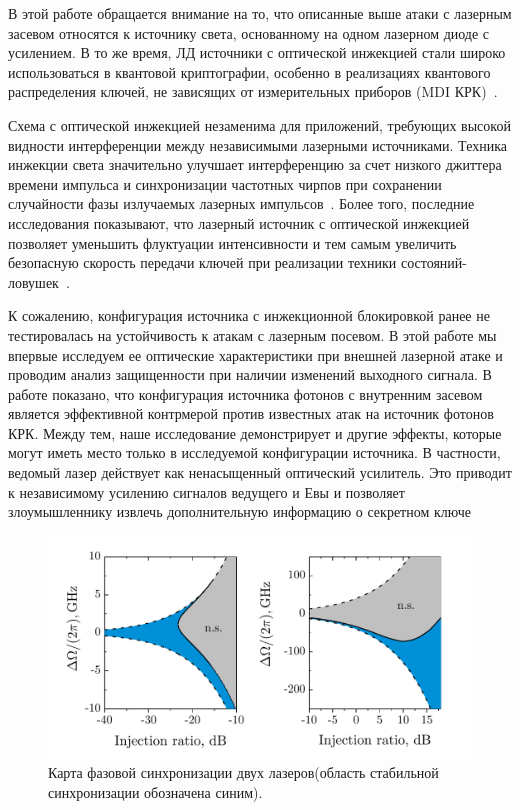 В этой работе обращается внимание на то, что описанные выше атаки с лазерным засевом относятся к источнику света, основанному на одном лазерном диоде с усилением. В то же время, ЛД источники с оптической инжекцией стали широко использоваться в квантовой криптографии, особенно в реализациях квантового распределения ключей, не зависящих от измерительных приборов (MDI КРК)~\cite{wei2020,woodward2021}.

Схема с оптической инжекцией незаменима для приложений, требующих высокой видности интерференции между независимыми лазерными источниками. Техника инжекции света значительно улучшает интерференцию за счет низкого джиттера времени импульса и синхронизации частотных чирпов при сохранении случайности фазы излучаемых лазерных импульсов~\cite{comandar2016}. Более того, последние исследования показывают, что лазерный источник с оптической инжекцией позволяет уменьшить флуктуации интенсивности и тем самым увеличить безопасную скорость передачи ключей при реализации техники состояний-ловушек~\cite{xie2019}. %
 
К сожалению, конфигурация источника с инжекционной блокировкой ранее не тестировалась на устойчивость к атакам с лазерным посевом. В этой работе мы впервые исследуем ее оптические характеристики при внешней лазерной атаке и проводим анализ защищенности при наличии изменений выходного сигнала. В работе показано, что конфигурация источника фотонов с внутренним засевом является эффективной контрмерой против известных атак на источник фотонов КРК. Между тем, наше исследование демонстрирует и другие эффекты, которые могут иметь место только в исследуемой конфигурации источника. В частности, ведомый лазер действует как ненасыщенный оптический усилитель. Это приводит к независимому усилению сигналов ведущего и Евы и позволяет злоумышленнику извлечь дополнительную информацию о секретном ключе
\begin{figure}
\includegraphics{images/StabilityDiagramsFreq.pdf}
\caption{Карта фазовой синхронизации двух лазеров(область стабильной синхронизации обозначена синим).}
\label{fig:injection}
\end{figure}
